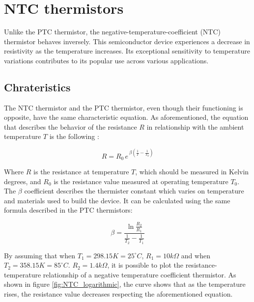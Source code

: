 \vspace{30px}\section{NTC thermistors}
Unlike the PTC thermistor, the negative-temperature-coefficient (NTC) thermistor behaves inversely. This semiconductor device experiences a decrease in resistivity as the temperature increases. Its exceptional sensitivity to temperature variations contributes to its popular use across various applications.





\subsection{Chrateristics}
The NTC thermistor and the PTC thermistor, even though their functioning is opposite, have the same characteristic equation. As aforementioned, the equation that describes the behavior of the resistance $R$ in relationship with the ambient temperature $T$ is the following \cite{Chen20091103}:

\begin{equation*}
    R = R_0 \, e^{\, \beta\left( \frac{1}{T} - \frac{1}{T_0}\right)}
\end{equation*}

\noindent Where $R$ is the resistance at temperature $T$, which should be measured in Kelvin degrees, and $R_0$ is the resistance value measured at operating temperature $T_0$. The $\beta$ coefficient describes the thermister constant which varies on temperature and materials used to build the device. It can be calculated using the same formula described in the PTC thermistors:

\begin{equation*}
    \beta = \frac{\ln{\frac{R_2}{R_1}}}{\frac{1}{T_2} - \frac{1}{T_1}}
\end{equation*}

\noindent By assuming that when $T_1 = 298.15 K = 25^\circ C$, $R_1 = 10k\Omega$ and when $T_2 = 358.15 K = 85^\circ C$. $R_2 = 1.4k\Omega$, it is possible to plot the resistance-temperature relationship of a negative temperature coefficient thermistor. As shown in figure \ref{fig:NTC_logarithmic}, the curve shows that as the temperature rises, the resistance value decreases respecting the aforementioned equation.

